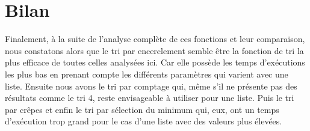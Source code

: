 \documentclass[a4paper, 12pt]{article}
\begin{document}
\section{Bilan}

Finalement, à la suite de l’analyse complète de ces fonctions et leur comparaison, nous constatons alors que le tri par encerclement semble être la fonction de tri la plus efficace de toutes celles analysées ici. Car elle possède les temps d’exécutions les plus bas en prenant compte les différents paramètres qui varient avec une liste. Ensuite nous avons le tri par comptage qui, même s’il ne présente pas des résultats comme le tri 4, reste envisageable à utiliser pour une liste. Puis le tri par crêpes et enfin le tri par sélection du minimum qui, eux, ont un temps d’exécution trop grand pour le cas d’une liste avec des valeurs plus élevées.
\end{document}
